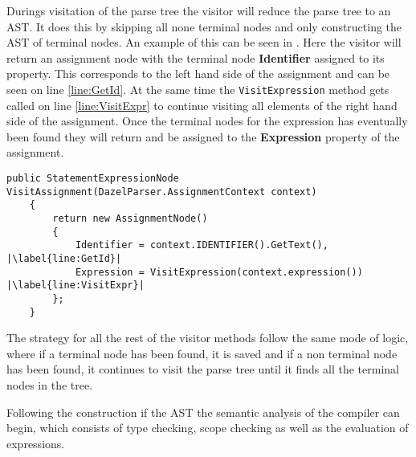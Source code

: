 Durings visitation of the parse tree the visitor will reduce the parse tree to an AST. It does this by skipping all none terminal nodes and only constructing the AST of terminal nodes. An example of this can be seen in . 
Here the visitor will return an assignment node with the terminal node \textbf{Identifier} assigned to its property. This corresponds to the left hand side of the assignment and can be seen on line \ref{line:GetId}. At the same time the \texttt{VisitExpression} method gets called on line \ref{line:VisitExpr} to continue visiting all elements of the right hand side of the assignment. Once the terminal nodes for the expression has eventually been found they will return and be assigned to the \textbf{Expression} property of the assignment.

\begin{lstlisting}[caption={Visit assignment}, label={lst:VisitAssignment},escapechar=|]
    public StatementExpressionNode VisitAssignment(DazelParser.AssignmentContext context)
    {
        return new AssignmentNode()
        {
            Identifier = context.IDENTIFIER().GetText(), |\label{line:GetId}|
            Expression = VisitExpression(context.expression()) |\label{line:VisitExpr}|
        };
    }
\end{lstlisting}

The strategy for all the rest of the visitor methods follow the same mode of logic, where if a terminal node has been found, it is saved and if a non terminal node has been found, it continues to visit the parse tree until it finds all the terminal nodes in the tree.

Following the construction if the AST the semantic analysis of the compiler can begin, which consists of type checking, scope checking as well as the evaluation of expressions.




